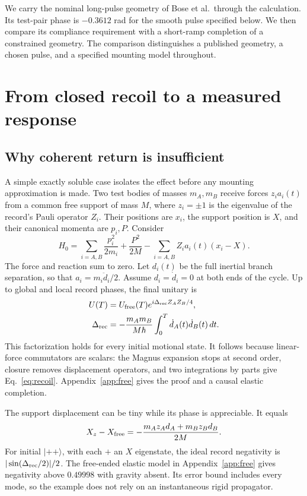 \documentclass[aps,pra,reprint,amsmath,amssymb,longbibliography,floatfix]{revtex4-2}
\newcommand{\ket}[1]{\lvert#1\rangle}
\begin{document}
We carry the nominal long-pulse geometry of Bose et al.\ through the calculation. Its test-pair phase is $-0.3612$ rad for the smooth pulse specified below. We then compare its compliance requirement with a short-ramp completion of a constrained geometry. The comparison distinguishes a published geometry, a chosen pulse, and a specified mounting model throughout.

\section{From closed recoil to a measured response}
\subsection{Why coherent return is insufficient}
A simple exactly soluble case isolates the effect before any mounting approximation is made. Two test bodies of masses $m_A,m_B$ receive forces $z_i a_i(t)$ from a common free support of mass $M$, where $z_i=\pm1$ is the eigenvalue of the record's Pauli operator $Z_i$. Their positions are $x_i$, the support position is $X$, and their canonical momenta are $p_i,P$. Consider
\begin{equation}
H_0=\sum_{i=A,B}\frac{p_i^2}{2m_i}+\frac{P^2}{2M}-\sum_{i=A,B}Z_i a_i(t)(x_i-X).
\label{eq:freeH}
\end{equation}
The force and reaction sum to zero. Let $d_i(t)$ be the full inertial branch separation, so that $a_i=m_i\ddot d_i/2$. Assume $d_i=\dot d_i=0$ at both ends of the cycle. Up to global and local record phases, the final unitary is
\begin{equation}
\begin{split}
U(T)&=U_{\rm free}(T)e^{i\Delta_{\rm rec}Z_AZ_B/4},\\
\Delta_{\rm rec}&=-\frac{m_A m_B}{M\hbar}\int_0^T\dot d_A(t)\dot d_B(t)\,dt.
\end{split}
\label{eq:recoil}
\end{equation}
This factorization holds for every initial motional state. It follows because linear-force commutators are scalars: the Magnus expansion stops at second order, closure removes displacement operators, and two integrations by parts give Eq.~\eqref{eq:recoil}. Appendix~\ref{app:free} gives the proof and a causal elastic completion.

The support displacement can be tiny while its phase is appreciable. It equals
\begin{equation}
X_z-X_{\rm free}=-\frac{m_Az_A d_A+m_Bz_Bd_B}{2M}.
\label{eq:displacement}
\end{equation}
For initial $\ket{++}$, with each $+$ an $X$ eigenstate, the ideal record negativity is $|\sin(\Delta_{\rm rec}/2)|/2$. The free-ended elastic model in Appendix~\ref{app:free} gives negativity above $0.49998$ with gravity absent. Its error bound includes every mode, so the example does not rely on an instantaneous rigid propagator.
\end{document}
